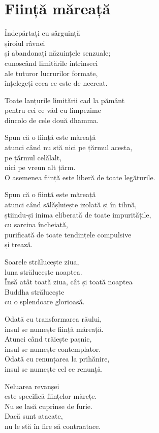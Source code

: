 
\chapter{Ființă măreață}


Îndepărtați cu sârguință\\
șiroiul râvnei\\
și abandonați năzuințele senzuale;\\
cunoscând limitările intrinseci\\
ale tuturor lucrurilor formate,\\
înțelegeți ceea ce este de necreat.


Toate lanțurile limitării cad la pământ\\
pentru cei ce văd cu limpezime\\
dincolo de cele două dhamma.


Spun că o ființă este măreață\\
atunci când nu stă nici pe țărmul acesta,\\
pe țărmul celălalt,\\
nici pe vreun alt țărm.\\
O asemenea ființă este liberă de toate legăturile.


Spun că o ființă este măreață\\
atunci când sălășluiește izolată și în tihnă,\\
știindu-și inima eliberată de toate impuritățile,\\
cu sarcina încheiată,\\
purificată de toate tendințele compulsive\\
și trează.


Soarele strălucește ziua,\\
luna strălucește noaptea.\\
Însă atât toată ziua, cât și toată noaptea\\
Buddha strălucește\\
cu o splendoare glorioasă.


Odată cu transformarea răului,\\
insul se numește ființă măreață.\\
Atunci când trăiește pașnic,\\
insul se numește contemplator.\\
Odată cu renunțarea la prihănire,\\
insul se numește cel ce renunță.


Neluarea revanșei\\
este specifică ființelor mărețe.\\
Nu se lasă cuprinse de furie.\\
Dacă sunt atacate,\\
nu le stă în fire să contraatace.


